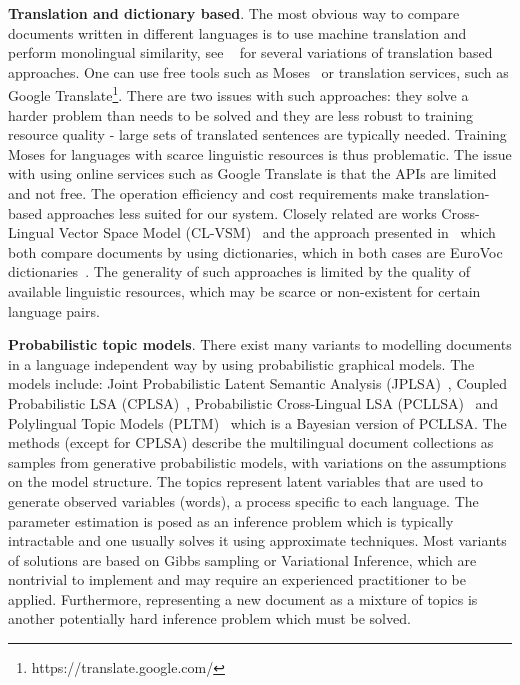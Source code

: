 \textbf{Translation and dictionary based}. The most obvious way to compare documents written in different languages is to use machine translation and perform monolingual similarity, see  ~\cite{multilingualBook,plagiarism} for several variations of translation based approaches. One can use free tools such as Moses~\cite{moses} or translation services, such as Google Translate\footnote{https://translate.google.com/}. There are two issues with such approaches: they solve a harder problem than needs to be solved and they are less robust to training resource quality - large sets of translated sentences are typically needed. Training Moses for languages with scarce linguistic resources is thus problematic. The issue with using online services such as Google Translate is that the APIs are limited and not free. The operation efficiency and cost requirements make translation-based approaches less suited for our system. Closely related are works Cross-Lingual Vector Space Model (CL-VSM)~\cite{plagiarism} and the approach presented in~\cite{pouliquen2008story} which both compare documents by using dictionaries, which in both cases are EuroVoc dictionaries~\cite{eurovoc}. The generality of such approaches is limited by the quality of available linguistic resources, which may be scarce or non-existent for certain language pairs.

\textbf{Probabilistic topic models}. There exist many variants to modelling documents in a language independent way by using probabilistic graphical models. The models include:  Joint Probabilistic Latent Semantic Analysis (JPLSA)~\cite{platt2010translingual}, Coupled Probabilistic LSA (CPLSA)~\cite{platt2010translingual}, Probabilistic Cross-Lingual LSA (PCLLSA)~\cite{PCL_LSA} and Polylingual Topic Models (PLTM)~\cite{polyLDA} which is a Bayesian version of PCLLSA. The methods (except for CPLSA) describe the multilingual document collections as samples from generative probabilistic models, with variations on the assumptions on the model structure. The topics represent latent variables that are used to generate observed variables (words), a process specific to each language. The parameter estimation is posed as an inference problem which is typically intractable and one usually solves it using approximate techniques. Most variants of solutions are based on Gibbs sampling or Variational Inference, which are nontrivial to implement and may require an experienced practitioner to be applied. Furthermore, representing a new document as a mixture of topics is another potentially hard inference problem which must be solved.


